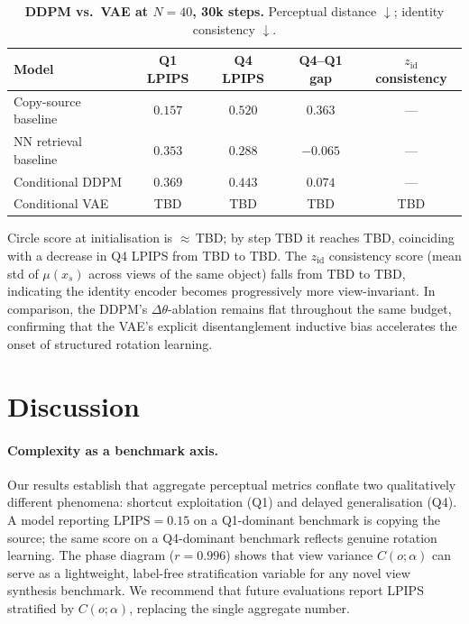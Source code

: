 \documentclass[11pt]{article}
\newcommand{\Dtheta}{\Delta\theta}
\newcommand{\lpips}{\mathrm{LPIPS}}
\begin{document}
\begin{table}[h]
  \small\centering
  \caption{\textbf{DDPM vs.\ VAE at $N=40$, 30k steps.}
    Perceptual distance $\downarrow$; identity consistency $\downarrow$.}
  \label{tab:vae}
  \begin{tabular}{lcccc}
    \toprule
    Model & Q1 LPIPS & Q4 LPIPS & Q4--Q1 gap & $z_\mathrm{id}$ consistency \\
    \midrule
    Copy-source baseline & $0.157$ & $0.520$ & $0.363$ & --- \\
    NN retrieval baseline & $0.353$ & $0.288$ & $-0.065$ & --- \\
    Conditional DDPM     & $0.369$ & $0.443$ & $0.074$  & --- \\
    Conditional VAE      & TBD     & TBD     & TBD      & TBD \\
    \bottomrule
  \end{tabular}
\end{table}

Circle score at initialisation is $\approx\,$TBD; by step TBD it reaches
TBD, coinciding with a decrease in Q4 LPIPS from TBD to TBD.  The
$z_\mathrm{id}$ consistency score (mean std of $\mu(x_s)$ across views of the
same object) falls from TBD to TBD, indicating the identity encoder becomes
progressively more view-invariant.  In comparison, the DDPM's $\Dtheta$-ablation
remains flat throughout the same budget, confirming that the VAE's explicit
disentanglement inductive bias accelerates the onset of structured
rotation learning.

\section{Discussion}
\label{sec:discussion}

\paragraph{Complexity as a benchmark axis.}
Our results establish that aggregate perceptual metrics conflate two qualitatively
different phenomena: shortcut exploitation (Q1) and delayed generalisation (Q4).
A model reporting $\lpips = 0.15$ on a Q1-dominant benchmark is copying the
source; the same score on a Q4-dominant benchmark reflects genuine rotation
learning.  The phase diagram ($r = 0.996$) shows that view variance $C(o;\alpha)$
can serve as a lightweight, label-free stratification variable for any novel view
synthesis benchmark.  We recommend that future evaluations report LPIPS
stratified by $C(o;\alpha)$, replacing the single aggregate number.
\end{document}
